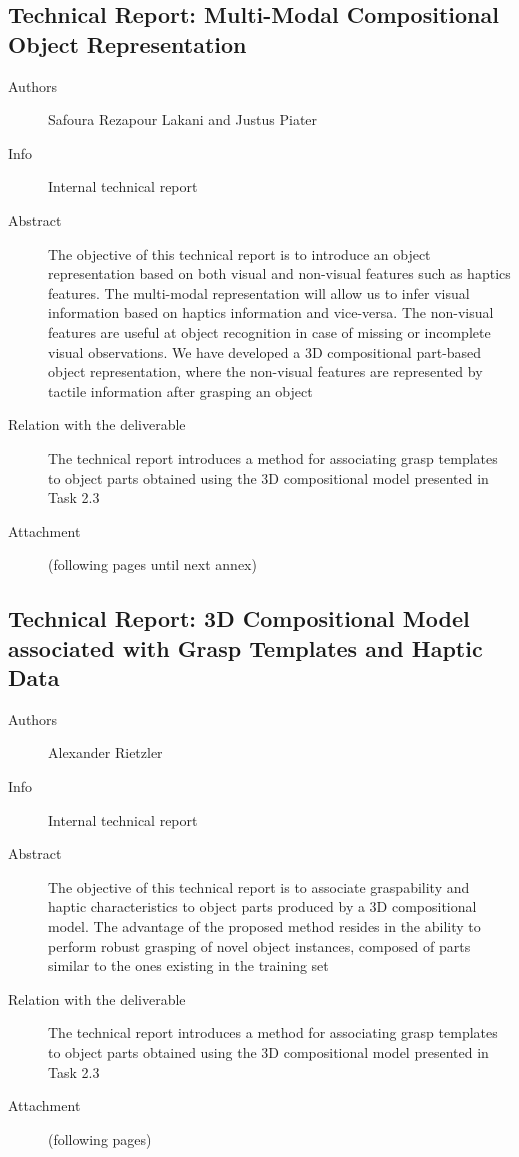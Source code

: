 \documentclass[a4paper,11pt,pdf]{pacmanreport}
\begin{document}
\subsection{Technical Report: Multi-Modal Compositional Object Representation} \label{ann:techReport}
\begin{description}
	\item[Authors] Safoura Rezapour Lakani and Justus Piater
	\item[Info] Internal technical report
	\item[Abstract] The objective of this technical report is to introduce an 
	object representation based on both visual and non-visual features such as 
	haptics features. The multi-modal representation will allow us to infer visual 
	information based on haptics information and vice-versa. The non-visual features 
	are useful at object recognition in case of missing or incomplete visual 
	observations. We have developed a 3D compositional part-based object 
	representation, where the non-visual features are represented by tactile 
	information after grasping an object
	\item[Relation with the deliverable] The technical report introduces a method for associating grasp templates to 
	object parts obtained using the 3D compositional model presented in Task 2.3
	\item[Attachment] (following pages until next annex)
\end{description}


\subsection{Technical Report: 3D Compositional Model associated with Grasp Templates and Haptic Data} \label{ann:techReportAlex}
\begin{description}
\item[Authors] Alexander Rietzler
\item[Info] Internal technical report
\item[Abstract] The objective of this technical report is to associate 
graspability and haptic characteristics to object parts produced by a 3D 
compositional model. The advantage of the proposed method resides in the ability 
to perform robust grasping of novel object instances, composed of parts similar 
to the ones existing in the training set
\item[Relation with the deliverable] The technical report introduces a method for associating grasp templates to object parts obtained using the 3D compositional model presented in Task 2.3
\item[Attachment] (following pages)
\end{description}

\end{document}

